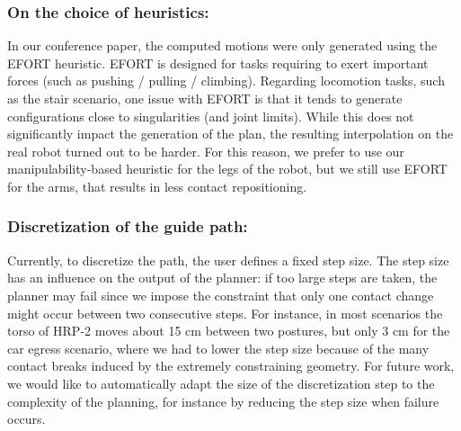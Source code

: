 \subsubsection{On the choice of heuristics:} \label{sec:heuristichoices}
In our conference paper, the computed motions were only generated using the EFORT heuristic.
EFORT is designed for tasks requiring to exert important forces (such as pushing / pulling / climbing). 
Regarding locomotion tasks, such as the stair scenario, one issue with EFORT is that it tends to generate
configurations close to singularities (and joint limits). While this does not significantly impact
the generation of the plan, the resulting interpolation on the real robot turned out to be harder.
For this reason, we prefer to use our manipulability-based heuristic for the legs of the robot, but we still
use EFORT for the arms, that results in less contact repositioning.


\subsubsection{Discretization of the guide path:} \label{sec:disc}
Currently, to discretize the path, the user defines a fixed step size. The step size
has an influence on the output of the planner: if too large steps are taken,
the planner may fail since we impose the constraint that only one contact change might occur
between two consecutive steps. For instance, in most scenarios the torso of HRP-2 moves about 15 cm between two postures, but only 3 cm
for the car egress scenario, where we had to lower the step size because of the many contact breaks induced by the extremely constraining geometry.
For future work, we would like to automatically adapt the size of the discretization step to the complexity of the planning, for instance
by reducing the step size when failure occurs.

